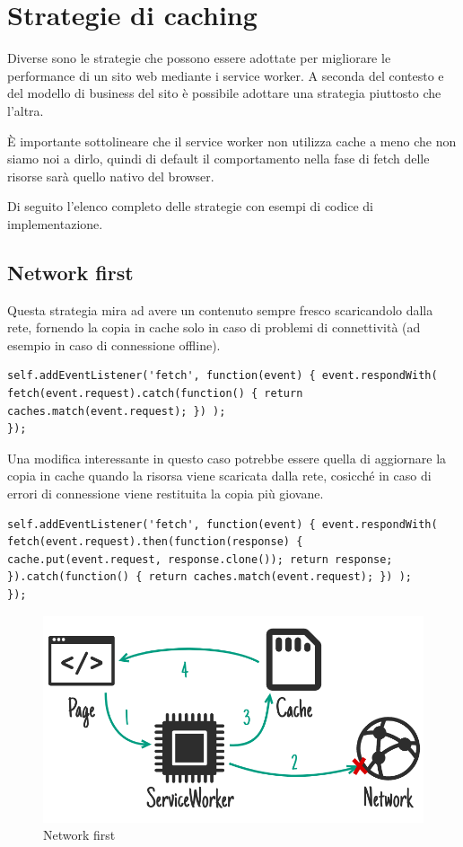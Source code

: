 \documentclass[italian]{article}
\begin{document}
\section{Strategie di caching}
Diverse sono le strategie che possono essere adottate per migliorare le performance di un sito web mediante i service worker. A seconda del contesto e del modello di business del sito è possibile adottare una strategia piuttosto che l’altra.

È importante sottolineare che il service worker non utilizza cache a meno che non siamo noi a dirlo, quindi di default il comportamento nella fase di fetch delle risorse sarà quello nativo del browser.

Di seguito l’elenco completo delle strategie con esempi di codice di implementazione. 
\subsection{Network first}
Questa strategia mira ad avere un contenuto sempre fresco scaricandolo dalla rete, fornendo la copia in cache solo in caso di problemi di connettività (ad esempio in caso di connessione offline).
\begin{lstlisting}
self.addEventListener('fetch', function(event) { event.respondWith( fetch(event.request).catch(function() { return caches.match(event.request); }) );
});
\end{lstlisting}
Una modifica interessante in questo caso potrebbe essere quella di aggiornare la copia in cache quando la risorsa viene scaricata dalla rete, cosicché in caso di errori di connessione viene restituita la copia più giovane.
\begin{lstlisting}
self.addEventListener('fetch', function(event) { event.respondWith( fetch(event.request).then(function(response) { cache.put(event.request, response.clone()); return response; }).catch(function() { return caches.match(event.request); }) );
});
\end{lstlisting}
\begin{figure}[h]
	\centering
	\includegraphics[width=1\linewidth]{Strategia1}
	\caption{Network first}
	\label{fig: Network first}
\end{figure}
\pagebreak
\end{document}
